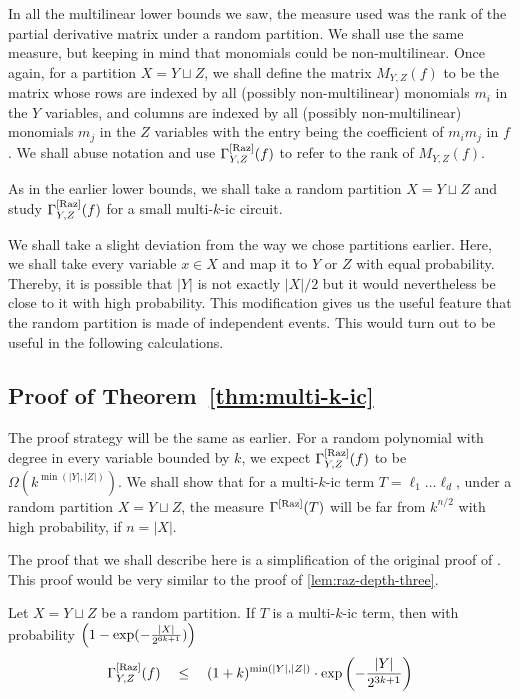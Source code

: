 In all the multilinear lower bounds we saw, the measure used was the rank of the partial derivative matrix under a random partition. 
We shall use the same measure, but keeping in mind that monomials could be non-multilinear. 
Once again, for a partition $X = Y \sqcup Z$, we shall define the matrix $M_{Y,Z}(f)$ to be the matrix whose rows are indexed by all (possibly non-multilinear) monomials $m_i$ in the $Y$ variables, and columns are indexed by all (possibly non-multilinear) monomials $m_j$ in the $Z$ variables with the entry being the coefficient of $m_i m_j$ in $f$. 
We shall abuse notation and use $\Gamma^{\mathrm{[Raz]}}_{Y,Z}(f)$ to refer to the rank of $M_{Y,Z}(f)$. 

As in the earlier lower bounds, we shall take a random partition $X = Y \sqcup Z$ and study $\Gamma^{\mathrm{[Raz]}}_{Y,Z}(f)$ for a small multi-$k$-ic circuit. 

\begin{remark*}\rm 
We shall take a slight deviation from the way we chose partitions earlier. 
Here, we shall take every variable $x\in X$ and map it to $Y$ or $Z$ with equal probability. 
Thereby, it is possible that $|Y|$ is not exactly $|X|/2$ but it would nevertheless be close to it with high probability. 
This modification gives us the useful feature that the random partition is made of independent events. 
This would turn out to be useful in the following calculations. 
\end{remark*}

\subsection*{Proof of Theorem~\ref{thm:multi-k-ic}}

The proof strategy will be the same as earlier. 
For a random polynomial with degree in every variable bounded by $k$, we expect $\Gamma^{\mathrm{[Raz]}}_{Y,Z}(f)$ to be $\Omega(k^{\min(|Y|,|Z|)})$. 
We shall show that for a multi-$k$-ic term $T = \ell_1\dots \ell_d$, under a random partition $X = Y \sqcup Z$, the measure $\Gamma^{\mathrm{[Raz]}}(T)$ will be far from $k^{n/2}$ with high probability, if $n = |X|$. 

The proof that we shall describe here is a simplification of the original proof of \cite{ks15}. 
This proof would be very similar to the proof of \autoref{lem:raz-depth-three}. 

\begin{lemma}\label{lem:multi-k-ic-ub}
Let $X = Y \sqcup Z$ be a random partition. 
If $T$ is a multi-$k$-ic term, then with probability $\left(1 - \exp(-\frac{|X|}{2^{6k+1}})\right)$
\[
\Gamma^{\mathrm{[Raz]}}_{Y,Z}(f) \quad \leq \quad (1+k)^{\min(|Y|,|Z|)}\cdot \exp\left(-\frac{|Y|}{2^{3k+1}}\right)
\]
\end{lemma}


